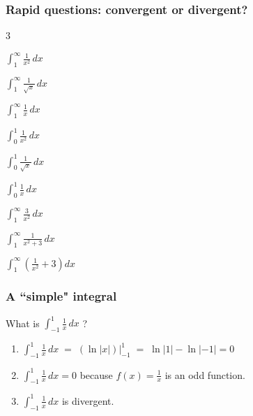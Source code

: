 \documentclass[14pt]{beamer}
\newcommand{\p}{\pause}
\begin{document}
	\begin{frame}[t]
		\frametitle{Rapid questions: convergent or divergent?}

		\begin{enumerate}
		\end{enumerate}
	\end{frame}


	\begin{frame}[t]
		\frametitle{A ``simple" integral}

		What is ${\displaystyle \int_{-1}^{1} \frac{1}{x} \, dx}$ \; ? \p

		\begin{enumerate}
			\vfill

			\item ${\displaystyle \int_{-1}^{1} \frac{1}{x} \, dx \; = \; \left( \ln |x| \right) \Big\vert_{-1}^{1} \; = \; \ln|1| - \ln|-1| = 0}$
				\vfill

			\item ${\displaystyle \int_{-1}^{1} \frac{1}{x} \, dx = 0}$ \; because ${\displaystyle f(x) = \frac{1}{x}}$
				is an odd function.
				\vfill

			\item ${\displaystyle \int_{-1}^{1} \frac{1}{x} \, dx}$ is divergent.
				\vfill
		\end{enumerate}
	\end{frame}
\end{document}
